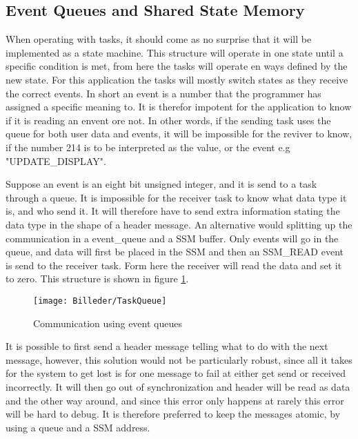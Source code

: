 \subsection{Event Queues and Shared State Memory}
\label{sec:EventQueuesandSharedStateMemory}

When operating with tasks, it should come as no surprise that it will be implemented as a state machine. This structure will operate in one state until a specific condition is met, from here the tasks will operate en ways defined by the new state. For this application the tasks will mostly switch states as they receive the correct events. In short an event is a number that the programmer has assigned a specific meaning to. It is therefor impotent for the application to know if it is reading an envent ore not.  In other words, if the sending task uses the queue for both user data and events, it will be impossible for the reviver to know, if the number 214 is to be interpreted as the value, or the event e.g "UPDATE\_DISPLAY". 

Suppose an event is an eight bit unsigned integer, and it is send to a task through a queue. It is impossible for the receiver task to know what data type it is, and who send it. It will therefore have to send extra information stating the data type in the shape of a header message. 
An alternative would splitting up the communication in a event\_queue and a SSM buffer. Only events will go in the queue, and data will first be placed in the SSM and then an SSM\_READ event is send to the receiver task. Form here the receiver will read the data and set it to zero. This structure is shown in figure \ref{fig:TaskQueue}.

\begin{figure}[h]
	\centering
	\texttt{[image: Billeder/TaskQueue]}
	\caption{Communication using event queues}
	\label{fig:TaskQueue}
\end{figure}

It is possible to first send a header message telling what to do with the next message, however, this solution would not be particularly robust, since all it takes for the system to get lost is for one message to fail at either get send or received incorrectly. It will then go out of synchronization and header will be read as data and the other way around, and since this error only happens at rarely this error will be hard to debug. It is therefore preferred to keep the messages atomic, by using a queue and a SSM address. 
 








